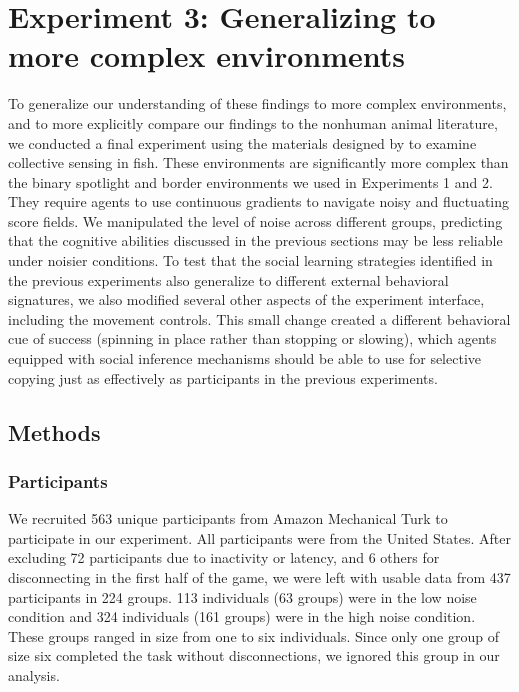 \documentclass[12pt,letterpaper]{article}
\begin{document}
\section{Experiment 3: Generalizing to more complex environments}

To generalize our understanding of these findings to more complex environments, and to more explicitly compare our findings to the nonhuman animal literature, we conducted a final experiment using the materials designed by  to examine collective sensing in fish.
These environments are significantly more complex than the binary spotlight and border environments we used in Experiments 1 and 2.
They require agents to use continuous gradients to navigate noisy and fluctuating score fields.
We manipulated the level of noise across different groups, predicting that the cognitive abilities discussed in the previous sections may be less reliable under noisier conditions. To test that the social learning strategies identified in the previous experiments also generalize to different external behavioral signatures, we also modified several other aspects of the experiment interface, including the movement controls.
This small change created a different behavioral cue of success (spinning in place rather than stopping or slowing), which agents equipped with social inference mechanisms should be able to use for selective copying just as effectively as participants in the previous experiments.

\subsection{Methods}
\subsubsection{Participants}

We recruited 563 unique participants from Amazon Mechanical Turk to participate in our experiment.
All participants were from the United States.
After excluding 72 participants due to inactivity or latency, and 6 others for disconnecting in the first half of the game, we were left with usable data from 437 participants in 224 groups.
113 individuals (63 groups) were in the low noise condition and 324 individuals (161 groups) were in the high noise condition. 
These groups ranged in size from one to six individuals.  
Since only one group of size six completed the task without disconnections, we ignored this group in our analysis.
\end{document}
